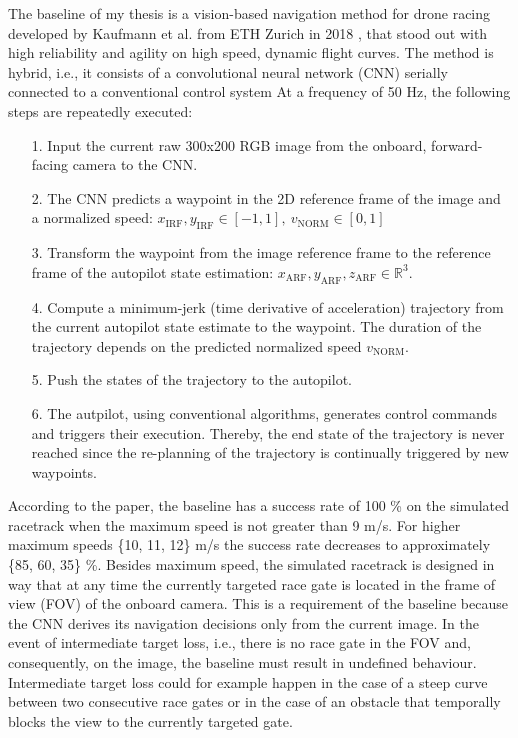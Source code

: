 The baseline of my thesis is a vision-based navigation method for drone racing
developed by Kaufmann et al. from ETH Zurich in 2018 \cite{Kaufmann2018},
that stood out with high reliability and agility on high speed, dynamic flight curves.
The method is hybrid, i.e., 
it consists of a convolutional neural network (CNN)
serially connected to a conventional control system
At a frequency of 50 Hz, the following steps are repeatedly executed:
\begin{itemize}
	\item[1.] Input the current raw 300x200 RGB image from the onboard, forward-facing camera to the CNN.
	\item[2.] The CNN predicts a waypoint in the 2D reference frame of the image and a normalized speed:
				$x_\text{IRF}, y_\text{IRF} \in [-1, 1],\ v_\text{NORM} \in [0, 1]$ 
	\item[3.] Transform the waypoint from the image reference frame to the reference frame of the autopilot state estimation: 
				$x_\text{ARF}, y_\text{ARF}, z_\text{ARF} \in \mathbb R^3$.
	\item[4.] Compute a minimum-jerk (time derivative of acceleration) trajectory from the current autopilot state estimate to the waypoint.
				The duration of the trajectory depends on the predicted normalized speed $v_\text{NORM}$.
	\item[5.] Push the states of the trajectory to the autopilot.
	\item[6.] The autpilot, using conventional algorithms, generates control commands and triggers their execution.
				Thereby, the end state of the trajectory is never reached since the re-planning of the trajectory is continually triggered by new waypoints.
\end{itemize}
According to the paper, the baseline has a success rate of 100 \% on the simulated racetrack when 
the maximum speed is not greater than 9 m/s. For higher maximum speeds
\{10, 11, 12\} m/s the success rate decreases to approximately \{85, 60, 35\} \%.
Besides maximum speed, the simulated racetrack is designed in way that at any time the 
currently targeted race gate is located in the frame of view (FOV) of the onboard camera.
This is a requirement of the baseline because the CNN derives its navigation decisions only
from the current image. In the event of intermediate target loss, i.e.,
there is no race gate in the FOV and, consequently, on the image, the baseline 
must result in undefined behaviour. 
Intermediate target loss could for example 
happen in the case of a steep curve between two consecutive race gates
or in the case of an obstacle that temporally blocks the view to the currently targeted gate.


